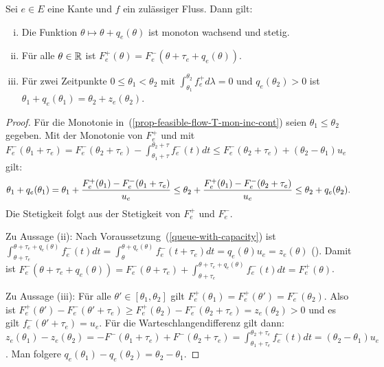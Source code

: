 \begin{proposition}\label{prop-feasible-flow}
	Sei $e\in E$ eine Kante und $f$ ein zulässiger Fluss. Dann gilt:
	\begin{enumerate}[(i)]
		\item\label{prop-feasible-flow-T-mon-inc-cont} Die Funktion $\theta \mapsto \theta + q_e(\theta)$ ist monoton wachsend und stetig.
		\item\label{prop-feasible-flow-det-outflow} Für alle $\theta\in\mathbb{R}$ ist $F_e^+(\theta) = F_e^-(\theta+\tau_e+q_e(\theta))$.
		\item Für zwei Zeitpunkte $0\leq \theta_1 < \theta_2$ mit $\int_{\theta_1}^{\theta_2} f^+_e d\lambda = 0$ und $q_e(\theta_2)>0$ ist $\theta_1 + q_e(\theta_1) = \theta_2 + z_e(\theta_2)$.
	\end{enumerate}
\end{proposition}
\begin{proof}
	Für die Monotonie in~(\ref{prop-feasible-flow-T-mon-inc-cont}) seien $\theta_1 \leq \theta_2$ gegeben.
	Mit der Monotonie von $F_e^+$ und mit $F_e^-(\theta_1 + \tau_e) = F_e^-(\theta_2+\tau_e) - \int_{\theta_1+\tau}^{\theta_2+\tau} f_e^-(t)dt\leq F_e^-(\theta_2 + \tau_e) + (\theta_2 - \theta_1)u_e$ gilt: 
	$$
		\theta_1 + q_e(\theta_1)
		= \theta_1 + \frac{F_e^+(\theta_1) - F_e^-(\theta_1 + \tau_e)}{u_e}\\
		\leq \theta_2 + \frac{F_e^+(\theta_1) - F_e^-(\theta_2+\tau_e)}{u_e} \leq \theta_2 + q_e(\theta_2).
	$$
	Die Stetigkeit folgt aus der Stetigkeit von $F_e^+$ und $F_e^-$.
	
	Zu Aussage (ii): Nach Voraussetzung~(\ref{queue-with-capacity}) ist $\int_{\theta + \tau_e}^{\theta + \tau_e + q_e(\theta)} f_e^-(t) dt = \int_{\theta}^{\theta + q_e(\theta)}f_e^-(t + \tau_e) dt = q_e(\theta)  u_e = z_e(\theta)$ (). Damit ist $F_e^-(\theta + \tau_e + q_e(\theta)) = F_e^-(\theta+\tau_e) + \int_{\theta+\tau_e}^{\theta+\tau_e+q_e(\theta)}f_e^-(t)dt = F_e^+(\theta)$.
	
	Zu Aussage (iii): Für alle $\theta'\in [\theta_1, \theta_2]$ gilt $F_e^+(\theta_1) = F_e^+(\theta') = F_e^-(\theta_2)$.
	Also ist $F_e^+(\theta') - F_e^-(\theta' + \tau_e) \geq F_e^+(\theta_2)-F_e^-(\theta_2 + \tau_e) = z_e(\theta_2) > 0$ und es gilt $f_e^-(\theta' + \tau_e)=u_e$.
	Für die Warteschlangendifferenz gilt dann: 
	$z_e(\theta_1)-z_e(\theta_2)=-F^-(\theta_1 + \tau_e) + F^-(\theta_2 + \tau_e) = \int_{\theta_1 + \tau_e}^{\theta_2 + \tau_e} f^-_e(t) dt = (\theta_2 - \theta_1)u_e$.
	Man folgere $q_e(\theta_1) - q_e(\theta_2) = \theta_2 - \theta_1$.
\end{proof}

